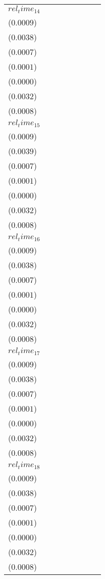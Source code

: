\begin{tabular}{llllllll}
$rel_time_14$ & \makecell{$0.0029^{***}$ \\ ($0.0009$)} & \makecell{$0.0127^{***}$ \\ ($0.0038$)} & \makecell{$-0.0014^{**}$ \\ ($0.0007$)} & \makecell{$-0.0001^{}$ \\ ($0.0001$)} & \makecell{$-0.0000^{}$ \\ ($0.0000$)} & \makecell{$0.0110^{***}$ \\ ($0.0032$)} & \makecell{$0.0024^{***}$ \\ ($0.0008$)} \\
$rel_time_15$ & \makecell{$0.0040^{***}$ \\ ($0.0009$)} & \makecell{$0.0158^{***}$ \\ ($0.0039$)} & \makecell{$-0.0001^{}$ \\ ($0.0007$)} & \makecell{$0.0001^{}$ \\ ($0.0001$)} & \makecell{$0.0000^{}$ \\ ($0.0000$)} & \makecell{$0.0142^{***}$ \\ ($0.0032$)} & \makecell{$0.0035^{***}$ \\ ($0.0008$)} \\
$rel_time_16$ & \makecell{$0.0038^{***}$ \\ ($0.0009$)} & \makecell{$0.0140^{***}$ \\ ($0.0038$)} & \makecell{$0.0014^{**}$ \\ ($0.0007$)} & \makecell{$0.0003^{***}$ \\ ($0.0001$)} & \makecell{$0.0001^{***}$ \\ ($0.0000$)} & \makecell{$0.0142^{***}$ \\ ($0.0032$)} & \makecell{$0.0040^{***}$ \\ ($0.0008$)} \\
$rel_time_17$ & \makecell{$0.0032^{***}$ \\ ($0.0009$)} & \makecell{$0.0124^{***}$ \\ ($0.0038$)} & \makecell{$0.0006^{}$ \\ ($0.0007$)} & \makecell{$0.0001^{*}$ \\ ($0.0001$)} & \makecell{$0.0001^{**}$ \\ ($0.0000$)} & \makecell{$0.0122^{***}$ \\ ($0.0032$)} & \makecell{$0.0032^{***}$ \\ ($0.0008$)} \\
$rel_time_18$ & \makecell{$0.0041^{***}$ \\ ($0.0009$)} & \makecell{$0.0168^{***}$ \\ ($0.0038$)} & \makecell{$0.0009^{}$ \\ ($0.0007$)} & \makecell{$0.0002^{*}$ \\ ($0.0001$)} & \makecell{$0.0001^{***}$ \\ ($0.0000$)} & \makecell{$0.0144^{***}$ \\ ($0.0032$)} & \makecell{$0.0036^{***}$ \\ ($0.0008$)} \\

\end{tabular}
